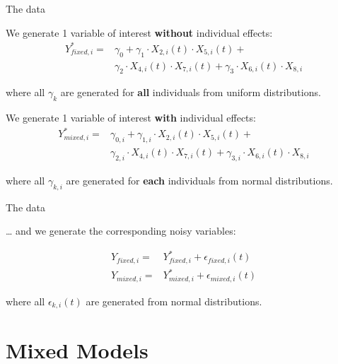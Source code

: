 \documentclass{beamer}
\begin{document}
\begin{frame}{The data}

	We generate 1 variable of interest \textbf{without} individual effects:
	\begin{align*}
		Y^*_{fixed,i} = & \gamma_{0} +
		\gamma_{1} \cdot  X_{2,i}(t) \cdot X_{5,i}(t) + \\
		& \gamma_{2} \cdot  X_{4,i}(t) \cdot X_{7,i}(t) +
		\gamma_{3} \cdot  X_{6,i}(t) \cdot X_{8,i}
	\end{align*}

	where all $\gamma_{k}$ are generated for \textbf{all} individuals from uniform distributions.

	\bigskip

	We generate 1 variable of interest \textbf{with} individual effects:
	\begin{align*}
		Y^*_{mixed,i} = &\gamma_{0,i} +
		\gamma_{1,i} \cdot X_{2,i}(t) \cdot X_{5,i}(t) + \\
		& \gamma_{2,i} \cdot X_{4,i}(t) \cdot X_{7,i}(t) +
		\gamma_{3,i} \cdot X_{6,i}(t) \cdot X_{8,i}
	\end{align*}

	where all $\gamma_{k,i}$ are generated for \textbf{each} individuals from normal distributions.

\end{frame}






\begin{frame}{The data}

	… and we generate the corresponding noisy variables:


	\begin{align*}
		Y_{fixed,i} = & Y^*_{fixed,i} + \epsilon_{fixed,i}(t) \\
		Y_{mixed,i} = & Y^*_{mixed,i} + \epsilon_{mixed,i}(t)
	\end{align*}

	where all $\epsilon_{k,i}(t)$ are generated from normal distributions.

	\bigskip
\end{frame}



\section{Mixed Models}
\end{document}
